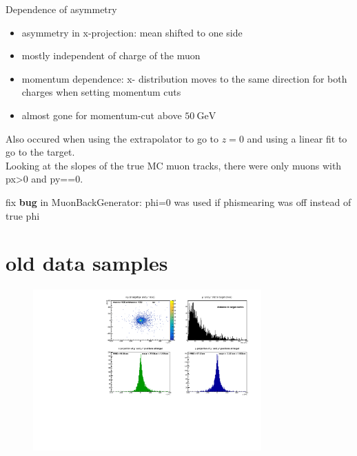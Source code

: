 \begin{frame}[t]{Dependence of asymmetry}
  \begin{itemize}
    \item asymmetry in x-projection: mean shifted to one side
    \item mostly independent of charge of the muon
    \item momentum dependence: x- distribution moves to the same direction for both charges when setting momentum cuts
    \item almost gone for momentum-cut above $\SI{50}{\giga\electronvolt}$
  \end{itemize}
  Also occured when using the extrapolator to go to $z=0$ and using a linear fit to go to the target. \\ Looking at the slopes of the true MC muon tracks, there were only muons with px>0 and py==0. \\
  \begin{framed}
    fix \textbf{bug} in MuonBackGenerator: phi=0 was used if phismearing was off instead of true phi
  \end{framed}
\end{frame}


\section{old data samples}

\begin{frame}[t]{}
  \begin{figure}
    \centering
    \includegraphics[width=0.78\textwidth]{../hists/nofield/old/target_dist.pdf}
  \end{figure}
\end{frame}

